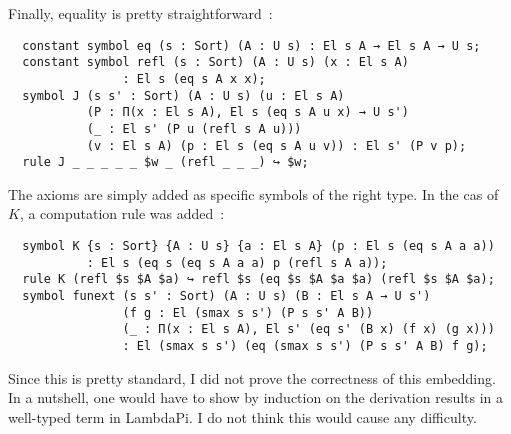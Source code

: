 Finally, equality is pretty straightforward~:

\begin{lstlisting}
  constant symbol eq (s : Sort) (A : U s) : El s A → El s A → U s;
  constant symbol refl (s : Sort) (A : U s) (x : El s A)
                : El s (eq s A x x);
  symbol J (s s' : Sort) (A : U s) (u : El s A)
           (P : Π(x : El s A), El s (eq s A u x) → U s')
           (_ : El s' (P u (refl s A u)))
           (v : El s A) (p : El s (eq s A u v)) : El s' (P v p);
  rule J _ _ _ _ _ $w _ (refl _ _ _) ↪ $w;
\end{lstlisting}

The axioms are simply added as specific symbols of the right type. In the cas of
$K$, a computation rule was added~:

\begin{lstlisting}
  symbol K {s : Sort} {A : U s} {a : El s A} (p : El s (eq s A a a))
           : El s (eq s (eq s A a a) p (refl s A a));
  rule K (refl $s $A $a) ↪ refl $s (eq $s $A $a $a) (refl $s $A $a);
  symbol funext (s s' : Sort) (A : U s) (B : El s A → U s')
                (f g : El (smax s s') (P s s' A B))
                (_ : Π(x : El s A), El s' (eq s' (B x) (f x) (g x)))
                : El (smax s s') (eq (smax s s') (P s s' A B) f g);
\end{lstlisting}

Since this is pretty standard, I did not prove the correctness of this embedding.
In a nutshell, one would have to show by induction on the derivation results in a
well-typed term in LambdaPi. I do not think this would cause any difficulty.
